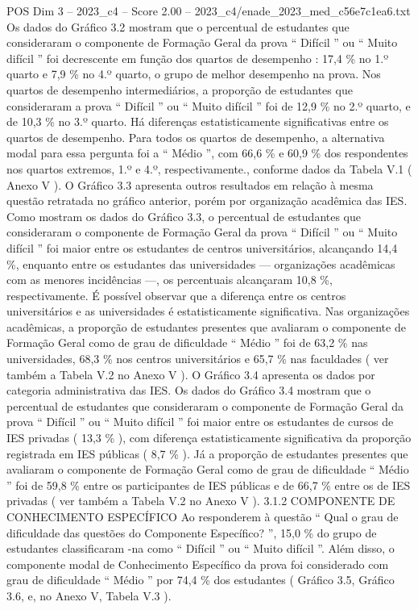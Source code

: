 \begin{textsample}{POS Dim 3 – 2023\_c4 – Score 2.00 – 2023\_c4/enade\_2023\_med\_c56e7c1ea6.txt}
Os dados do Gráfico 3.2 mostram que o percentual de estudantes que consideraram o componente de Formação Geral da prova “ Difícil ” ou “ Muito difícil ” foi decrescente em função dos quartos de desempenho : 17,4 \% no 1.º quarto e 7,9 \% no 4.º quarto, o grupo de melhor desempenho na prova.
Nos quartos de desempenho intermediários, a proporção de estudantes que consideraram a prova “ Difícil ” ou “ Muito difícil ” foi de 12,9 \% no 2.º quarto, e de 10,3 \% no 3.º quarto.
Há diferenças estatisticamente significativas entre os quartos de desempenho.
Para todos os quartos de desempenho, a alternativa modal para essa pergunta foi a “ Médio ”, com 66,6 \% e 60,9 \% dos respondentes nos quartos extremos, 1.º e 4.º, respectivamente., conforme dados da Tabela V.1 ( Anexo V ).
O Gráfico 3.3 apresenta outros resultados em relação à mesma questão retratada no gráfico anterior, porém por organização acadêmica das IES.
Como mostram os dados do Gráfico 3.3, o percentual de estudantes que consideraram o componente de Formação Geral da prova “ Difícil ” ou “ Muito difícil ” foi maior entre os estudantes de centros universitários, alcançando 14,4 \%, enquanto entre os estudantes das universidades — organizações acadêmicas com as menores incidências —, os percentuais alcançaram 10,8 \%, respectivamente.
É possível observar que a diferença entre os centros universitários e as universidades é estatisticamente significativa.
Nas organizações acadêmicas, a proporção de estudantes presentes que avaliaram o componente de Formação Geral como de grau de dificuldade “ Médio ” foi de 63,2 \% nas universidades, 68,3 \% nos centros universitários e 65,7 \% nas faculdades ( ver também a Tabela V.2 no Anexo V ).
O Gráfico 3.4 apresenta os dados por categoria administrativa das IES.
Os dados do Gráfico 3.4 mostram que o percentual de estudantes que consideraram o componente de Formação Geral da prova “ Difícil ” ou “ Muito difícil ” foi maior entre os estudantes de cursos de IES privadas ( 13,3 \% ), com diferença estatisticamente significativa da proporção registrada em IES públicas ( 8,7 \% ).
Já a proporção de estudantes presentes que avaliaram o componente de Formação Geral como de grau de dificuldade “ Médio ” foi de 59,8 \% entre os participantes de IES públicas e de 66,7 \% entre os de IES privadas ( ver também a Tabela V.2 no Anexo V ). 3.1.2 COMPONENTE DE CONHECIMENTO ESPECÍFICO Ao responderem à questão “ Qual o grau de dificuldade das questões do Componente Específico? ”, 15,0 \% do grupo de estudantes classificaram -na como “ Difícil ” ou “ Muito difícil ”.
Além disso, o componente modal de Conhecimento Específico da prova foi considerado com grau de dificuldade “ Médio ” por 74,4 \% dos estudantes ( Gráfico 3.5, Gráfico 3.6, e, no Anexo V, Tabela V.3 ).

\end{textsample}
